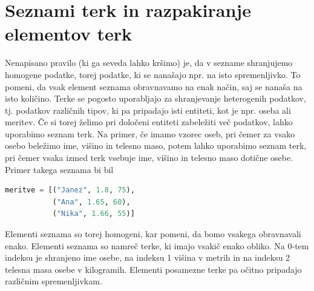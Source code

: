 \section{Seznami terk in razpakiranje elementov terk}

Nenapisano pravilo (ki ga seveda lahko kršimo) je, da v sezname shranjujemo homogene podatke, torej podatke, ki se nanašajo npr. na isto spremenljivko. To pomeni, da vsak element seznama obravnavamo na enak način, saj se nanaša na isto količino. Terke se pogosto uporabljajo za shranjevanje heterogenih podatkov, tj. podatkov različnih tipov, ki pa pripadajo isti entiteti, kot je npr. oseba ali meritev. Če si torej želimo pri določeni entiteti zabeležiti več podatkov, lahko uporabimo seznam terk. Na primer, če imamo vzorec oseb, pri čemer za vsako osebo beležimo ime, višino in telesno maso, potem lahko uporabimo seznam terk, pri čemer vsaka izmed terk vsebuje ime, višino in telesno maso dotične osebe. Primer takega seznama bi bil
\begin{lstlisting}[language=Python]
meritve = [("Janez", 1.8, 75),
           ("Ana", 1.65, 60), 
           ("Nika", 1.66, 55)]
\end{lstlisting}
Elementi seznama so torej homogeni, kar pomeni, da bomo vsakega obravnavali enako. Elementi seznama so namreč terke, ki imajo vsakič enako obliko. Na 0-tem indeksu je shranjeno ime osebe, na indeksu 1 višina v metrih in na indeksu 2 telesna masa osebe v kilogramih. Elementi posamezne terke pa očitno pripadajo različnim spremenljivkam.

